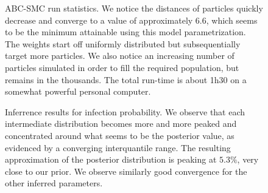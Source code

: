 \documentclass[11pt]{article}
\begin{document}
\begin{figure}
  \caption{ABC-SMC run statistics. We notice the distances of particles quickly decrease and converge to a value of approximately 6.6, which seems to be the minimum attainable using this model parametrization. The weights start off uniformly distributed but subsequentially target more particles. We also notice an increasing number of particles simulated in order to fill the required population, but remains in the thousands. The total run-time is about 1h30 on a somewhat powerful personal computer.}
  \label{fig:abcsmc_statistics}
\end{figure}

\begin{figure}
  \caption{Inferrence results for infection probability. We observe that each intermediate distribution becomes more and more peaked and concentrated around what seems to be the posterior value, as evidenced by a converging interquantile range. The resulting approximation of the posterior distribution is peaking at $5.3\%$, very close to our prior. We observe similarly good convergence for the other inferred parameters.}
  \label{fig:inferred_infection_probability}
\end{figure}
\end{document}

